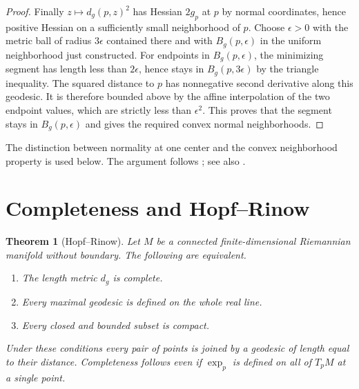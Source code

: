 \documentclass[11pt,oneside,openany]{book}
\theoremstyle{plain}
\newtheorem{theorem}{Theorem}[chapter]
\theoremstyle{definition}
\theoremstyle{remark}
\begin{document}
\begin{proof}
Finally \(z\mapsto d_g(p,z)^2\) has Hessian \(2g_p\) at \(p\)
by normal coordinates, hence positive Hessian on a sufficiently
small neighborhood of \(p\). Choose \(\epsilon>0\) with the
metric ball of radius \(3\epsilon\) contained there and with
\(B_g(p,\epsilon)\) in the uniform neighborhood just constructed.
For endpoints in \(B_g(p,\epsilon)\), the minimizing segment has
length less than \(2\epsilon\), hence stays in \(B_g(p,3\epsilon)\)
by the triangle inequality. The squared distance to \(p\) has
nonnegative second derivative along this geodesic. It is therefore
bounded above by the affine interpolation of the two endpoint
values, which are strictly less than \(\epsilon^2\).
This proves that the segment stays in \(B_g(p,\epsilon)\)
and gives the required convex normal neighborhoods.
\end{proof}

The distinction between normality at one center and the convex
neighborhood property is used below. The argument follows
\cite[Chapter 6, including the correction to Theorem 6.15]{LeeRM};
see also \cite[Chapter 3]{dC}.

\section{Completeness and Hopf--Rinow}\label{p202:G11}

\begin{theorem}[Hopf--Rinow]
\label{thm:p202-hopf-rinow}
Let \(M\) be a connected finite-dimensional Riemannian manifold
without boundary. The following are equivalent.
\begin{enumerate}
\item The length metric \(d_g\) is complete.
\item Every maximal geodesic is defined on the whole real line.
\item Every closed and bounded subset is compact.
\end{enumerate}
Under these conditions every pair of points is joined by a
geodesic of length equal to their distance. Completeness follows
even if \(\exp_p\) is defined on all of \(T_pM\) at a single point.
\end{theorem}
\end{document}
